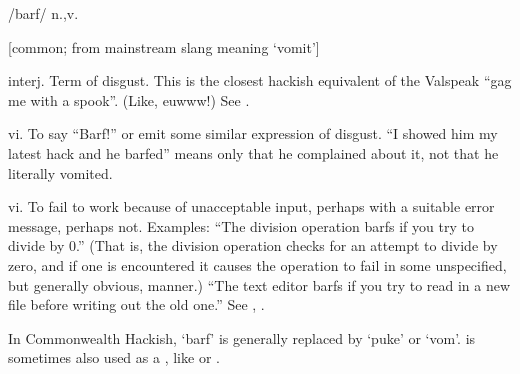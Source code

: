  /barf/ n.,v.

[common; from mainstream slang meaning `vomit']
\begin{inparaenum}
    \item interj. Term of disgust. This is the closest hackish equivalent of the
        Valspeak ``gag me with a spook''. (Like, euwww!) See .
    \item vi. To say ``Barf!'' or emit some similar expression of disgust. ``I
        showed him my latest hack and he barfed'' means only that he complained
        about it, not that he literally vomited.
    \item vi. To fail to work because of unacceptable input, perhaps with a
        suitable error message, perhaps not. Examples: ``The division operation
        barfs if you try to divide by 0.'' (That is, the division operation
        checks for an attempt to divide by zero, and if one is encountered it
        causes the operation to fail in some unspecified, but generally obvious,
        manner.) ``The text editor barfs if you try to read in a new file before
        writing out the old one.'' See , .
\end{inparaenum}

 In Commonwealth Hackish, `barf' is generally replaced by `puke' or `vom'.
 is sometimes also used as a ,
like  or .  

